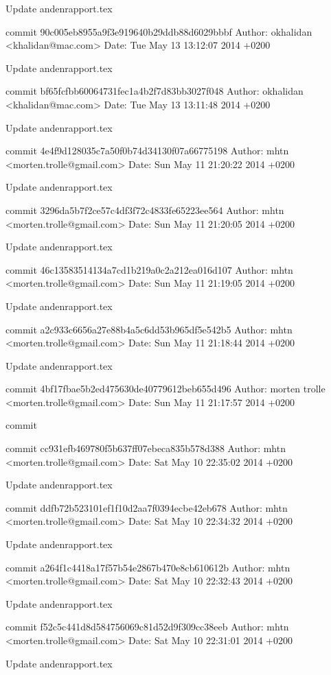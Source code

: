 \documentclass[12pt]{article}   %
\begin{document}
    Update andenrapport.tex

commit 90c005eb8955a9f3e919640b29ddb88d6029bbbf
Author: okhalidan <khalidan@mac.com>
Date:   Tue May 13 13:12:07 2014 +0200

    Update andenrapport.tex

commit bf65fcfbb60064731fec1a4b2f7d83bb3027f048
Author: okhalidan <khalidan@mac.com>
Date:   Tue May 13 13:11:48 2014 +0200

    Update andenrapport.tex

commit 4e4f9d128035c7a50f0b74d34130f07a66775198
Author: mhtn <morten.trolle@gmail.com>
Date:   Sun May 11 21:20:22 2014 +0200

    Update andenrapport.tex

commit 3296da5b7f2ce57c4df3f72c4833fe65223ee564
Author: mhtn <morten.trolle@gmail.com>
Date:   Sun May 11 21:20:05 2014 +0200

    Update andenrapport.tex

commit 46c13583514134a7cd1b219a0c2a212ea016d107
Author: mhtn <morten.trolle@gmail.com>
Date:   Sun May 11 21:19:05 2014 +0200

    Update andenrapport.tex

commit a2c933c6656a27e88b4a5c6dd53b965df5e542b5
Author: mhtn <morten.trolle@gmail.com>
Date:   Sun May 11 21:18:44 2014 +0200

    Update andenrapport.tex

commit 4bf17fbae5b2ed475630de40779612beb655d496
Author: morten trolle <morten.trolle@gmail.com>
Date:   Sun May 11 21:17:57 2014 +0200

    commit

commit cc931efb469780f5b637ff07ebeca835b578d388
Author: mhtn <morten.trolle@gmail.com>
Date:   Sat May 10 22:35:02 2014 +0200

    Update andenrapport.tex

commit ddfb72b523101ef1f10d2aa7f0394ecbe42eb678
Author: mhtn <morten.trolle@gmail.com>
Date:   Sat May 10 22:34:32 2014 +0200

    Update andenrapport.tex

commit a264f1c4418a17f57b54e2867b470e8cb610612b
Author: mhtn <morten.trolle@gmail.com>
Date:   Sat May 10 22:32:43 2014 +0200

    Update andenrapport.tex

commit f52c5c441d8d584756069c81d52d9f309cc38eeb
Author: mhtn <morten.trolle@gmail.com>
Date:   Sat May 10 22:31:01 2014 +0200

    Update andenrapport.tex
\end{document}
